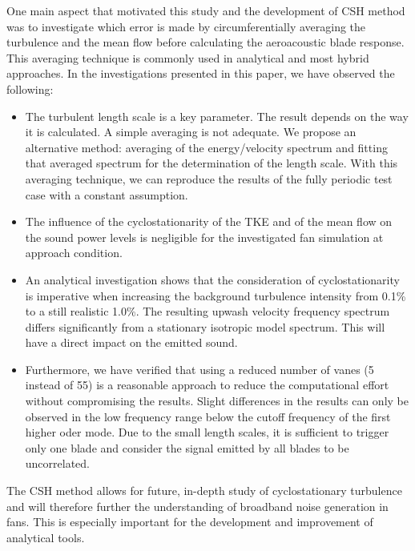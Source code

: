 One main aspect that motivated this study and the development of CSH method was to investigate which error is made by circumferentially averaging the turbulence and the mean flow before calculating the aeroacoustic blade response.  This averaging technique is commonly used in analytical and most hybrid approaches.  In the investigations presented in this paper, we have observed the following:   
\begin{itemize}
 \item The turbulent length scale is a key parameter. The result depends on the way it is calculated. A simple averaging is not adequate. We propose an alternative method: averaging of the energy/velocity spectrum and fitting that averaged spectrum for the determination of the length scale. With this averaging technique, we can reproduce the results of the fully periodic test case with a constant assumption.
 \item The influence of the cyclostationarity of the TKE and of the mean flow on the sound power levels is negligible for the investigated fan simulation at approach condition.
 \item An analytical investigation shows that the consideration of cyclostationarity is imperative when increasing the background turbulence intensity from 0.1\% to a still realistic 1.0\%. The resulting upwash velocity frequency spectrum differs significantly from a stationary isotropic model spectrum.  This will have a direct impact on the emitted sound.
 \item Furthermore, we have verified that using a reduced number of vanes (5 instead of 55) is a reasonable approach to reduce the computational effort without compromising the results.  Slight differences in the results can only be observed in the low frequency range below the cutoff frequency of the first higher oder mode. Due to the small length scales, it is sufficient to trigger only one blade and consider the signal emitted by all blades to be uncorrelated.
\end{itemize}

The CSH method allows for future, in-depth study of cyclostationary turbulence and will therefore further the understanding of broadband noise generation in fans.  This is especially important for the development and improvement of analytical tools. 

